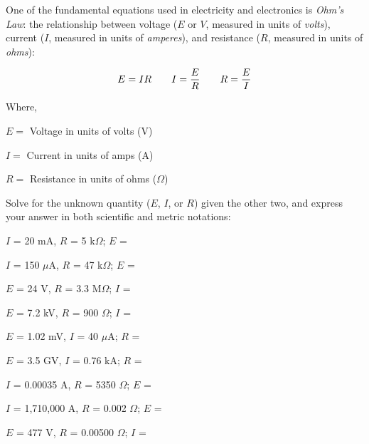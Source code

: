

One of the fundamental equations used in electricity and electronics is {\it Ohm's Law}: the relationship between voltage ($E$ or $V$, measured in units of {\it volts}), current ($I$, measured in units of {\it amperes}), and resistance ($R$, measured in units of {\it ohms}): 

$$E = IR \hskip 20pt I = {E \over R} \hskip 20pt R = {E \over I}$$

\noindent
Where,

$E = $ Voltage in units of volts (V)

$I = $ Current in units of amps (A)

$R = $ Resistance in units of ohms ($\Omega$)

\vskip 10pt

Solve for the unknown quantity ($E$, $I$, or $R$) given the other two, and express your answer in both scientific and metric notations:

\vskip 10pt

$I$ = 20 mA, $R$ = 5 k$\Omega$; \hskip 15pt $E$ = 

\vskip 10pt

$I$ = 150 $\mu$A, $R$ = 47 k$\Omega$; \hskip 15pt $E$ = 

\vskip 10pt

$E$ = 24 V, $R$ = 3.3 M$\Omega$; \hskip 15pt $I$ = 

\vskip 10pt

$E$ = 7.2 kV, $R$ = 900 $\Omega$; \hskip 15pt $I$ = 

\vskip 10pt

$E$ = 1.02 mV, $I$ = 40 $\mu$A; \hskip 15pt $R$ = 

\vskip 10pt

$E$ = 3.5 GV, $I$ = 0.76 kA; \hskip 15pt $R$ = 

\vskip 10pt

$I$ = 0.00035 A, $R$ = 5350 $\Omega$; \hskip 15pt $E$ = 

\vskip 10pt

$I$ = 1,710,000 A, $R$ = 0.002 $\Omega$; \hskip 15pt $E$ = 

\vskip 10pt

$E$ = 477 V, $R$ = 0.00500 $\Omega$; \hskip 15pt $I$ = 

\vskip 10pt

